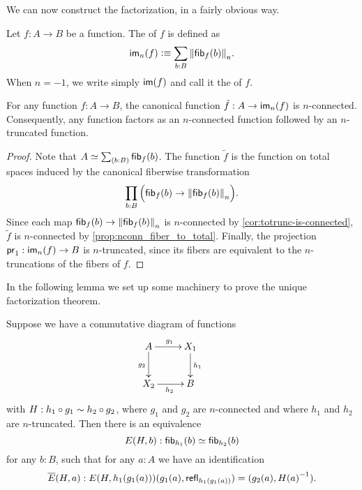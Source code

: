 We can now construct the factorization, in a fairly obvious way.

\begin{defn}\label{defn:modal-image}
Let $f:A\to B$ be a function. The 
%
%
%
%
of $f$ is defined as
\begin{equation*}
\im_n(f)\defeq \sm{b:B} \trunc n{\hfib{f}b}.
\end{equation*}
When $n=-1$, we write simply $\im(f)$ and call it the  of $f$.
\end{defn}

\begin{lem}\label{prop:to_image_is_connected}
For any function $f:A\to B$, the canonical function $\tilde{f}:A\to\im_n(f)$ is $n$-connected. 
Consequently, any function factors as an $n$-connected function followed by an $n$-truncated function.
\end{lem}

\begin{proof}
Note that $A\eqvsym\sm{b:B}\hfib{f}b$. The function $\tilde{f}$ is the function on total spaces induced by the canonical fiberwise transformation
\begin{equation*}
\prd{b:B} \Parens{\hfib{f}b\to\trunc n{\hfib{f}b}}.
\end{equation*}
Since each map $\hfib{f}b\to\trunc n{\hfib{f}b}$ is $n$-connected by \autoref{cor:totrunc-is-connected}, $\tilde{f}$ is $n$-connected by \autoref{prop:nconn_fiber_to_total}.
Finally, the projection $\proj1:\im_n(f) \to B$ is $n$-truncated, since its fibers are equivalent to the $n$-truncations of the fibers of $f$.
\end{proof}

In the following lemma we set up some machinery to prove the unique factorization theorem.

\begin{lem}\label{prop:factor_equiv_fiber}
Suppose we have a commutative diagram of functions
\begin{equation*}
  \xymatrix{
    {A} \ar[r]^{g_1} \ar[d]_{g_2} &
    {X_1} \ar[d]^{h_1} &
    \\
    {X_2} \ar[r]_{h_2}
    &
    {B}
  }
\end{equation*}
with $H:h_1\circ g_1\htpy h_2\circ g_2$, where $g_1$ and $g_2$ are $n$-connected and where $h_1$ and $h_2$ are $n$-truncated.
Then there is an equivalence
\begin{equation*}
E(H,b):\hfib{h_1}b\eqvsym\hfib{h_2}b
\end{equation*}
for any $b:B$, such that for any $a:A$ we have an identification
\[\overline{E}(H,a) :  E(H,h_1(g_1(a)))({g_1(a),\refl{h_1(g_1(a))}}) = \pairr{g_2(a),\opp{H(a)}}.\]
\end{lem}

